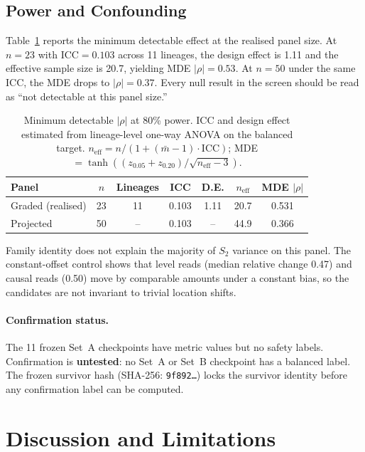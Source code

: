 \documentclass[11pt,letterpaper]{article}
\begin{document}
\subsection{Power and Confounding}
\label{sec:power}

Table~\ref{tab:power} reports the minimum detectable effect at the
realised panel size. At $n = 23$ with $\text{ICC} = 0.103$ across 11
lineages, the design effect is 1.11 and the effective sample size is
20.7, yielding MDE $|\rho| = 0.53$. At $n = 50$ under the same ICC, the
MDE drops to $|\rho| = 0.37$. Every null result in the screen should be
read as ``not detectable at this panel size.''

\begin{table}[!htbp]
\centering
\small
\caption{Minimum detectable $|\rho|$ at 80\% power. ICC and design effect
estimated from lineage-level one-way ANOVA on the balanced target.
$n_{\text{eff}} = n / (1 + (\bar{m} - 1) \cdot \text{ICC})$; MDE
$= \tanh((z_{0.05} + z_{0.20}) / \sqrt{n_{\text{eff}} - 3})$.}
\label{tab:power}
\begin{tabular}{@{}lcccccc@{}}
\toprule
Panel & $n$ & Lineages & ICC & D.E. & $n_{\text{eff}}$ & MDE $|\rho|$ \\
\midrule
Graded (realised) & 23 & 11 & 0.103 & 1.11 & 20.7 & 0.531 \\
Projected & 50 & -- & 0.103 & -- & 44.9 & 0.366 \\
\bottomrule
\end{tabular}
\end{table}

Family identity does not explain the majority of $S_2$ variance on this
panel. The constant-offset control shows that level reads (median relative
change 0.47) and causal reads (0.50) move by comparable amounts under a
constant bias, so the candidates are not invariant to trivial location
shifts.

\paragraph{Confirmation status.}
The 11 frozen Set~A checkpoints have metric values but no safety labels.
Confirmation is \textbf{untested}: no Set~A or Set~B checkpoint has a
balanced label. The frozen survivor hash (SHA-256: \texttt{9f892\ldots})
locks the survivor identity before any confirmation label can be computed.

\section{Discussion and Limitations}
\label{sec:discussion}
\end{document}
